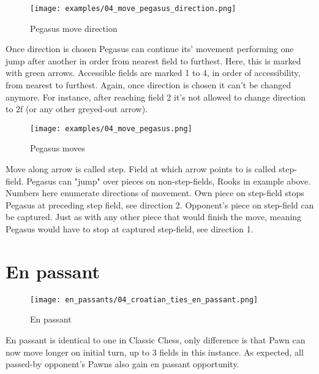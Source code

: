 \clearpage %

\noindent
\begin{figure}[!t]
\texttt{[image: examples/04\_move\_pegasus\_direction.png]}
\caption{Pegasus move direction}
\label{fig:pegasus_move_direction}
\end{figure}
Once direction is chosen Pegasus can continue its' movement performing one jump
after another in order from nearest field to furthest. Here, this is marked
with green arrows. Accessible fields are marked 1 to 4, in order of accessibility,
from nearest to furthest. Again, once direction is chosen it can't be changed anymore.
For instance, after reaching field 2 it's not allowed to change direction to 2f (or
any other greyed-out arrow).

\clearpage %

\noindent
\begin{figure}[!t]
\texttt{[image: examples/04\_move\_pegasus.png]}
\caption{Pegasus moves}
\label{fig:pegasus_moves}
\end{figure}
Move along arrow is called step. Field at which arrow points to is called step-field.
Pegasus can "jump" over pieces on non-step-fields, Rooks in example above. Numbers
here enumerate directions of movement. Own piece on step-field stops Pegasus at
preceding step field, see direction 2. Opponent's piece on step-field can be captured.
Just as with any other piece that would finish the move, meaning Pegasus would have to
stop at captured step-field, see direction 1.

\clearpage %

\section*{En passant}

\noindent
\begin{wrapfigure}[17]{l}{0.4\textwidth}
\texttt{[image: en\_passants/04\_croatian\_ties\_en\_passant.png]}
\caption{En passant}
\label{fig:cc_en_passant}
\end{wrapfigure}
En passant is identical to one in Classic Chess, only difference is that Pawn can now
move longer on initial turn, up to 3 fields in this instance. As expected, all passed-by
opponent's Pawns also gain en passant opportunity.

